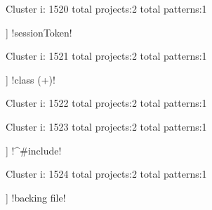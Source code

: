 Cluster i: 1520
total projects:2
total patterns:1
\begin{multicols}{1}
\begin{description}[noitemsep,topsep=0pt]
\item [[2] ] \cverb!sessionToken!
\end{description}
\end{multicols}







Cluster i: 1521
total projects:2
total patterns:1
\begin{multicols}{1}
\begin{description}[noitemsep,topsep=0pt]
\item [[2] ] \cverb!class (\w+)!
\end{description}
\end{multicols}







Cluster i: 1522
total projects:2
total patterns:1
\begin{multicols}{1}
\begin{description}[noitemsep,topsep=0pt]
\item [[2] ] \cverb!^\s*//\s*$!
\end{description}
\end{multicols}







Cluster i: 1523
total projects:2
total patterns:1
\begin{multicols}{1}
\begin{description}[noitemsep,topsep=0pt]
\item [[2] ] \cverb!^#include\s!
\end{description}
\end{multicols}







Cluster i: 1524
total projects:2
total patterns:1
\begin{multicols}{1}
\begin{description}[noitemsep,topsep=0pt]
\item [[2] ] \cverb!backing file!
\end{description}
\end{multicols}







